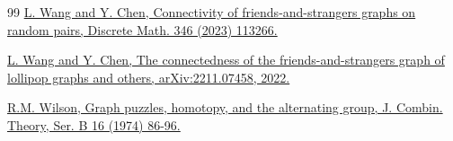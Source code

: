 \documentclass[11pt]{article}
\begin{document}
\begin{thebibliography}{99}
  \href{https://www.sciencedirect.com/science/article/pii/S0012365X22004721}{L. Wang and Y. Chen, Connectivity of friends-and-strangers graphs on random pairs, Discrete Math. 346 (2023) 113266.}

  \href{https://arxiv.org/abs/2211.07458}{L. Wang and Y. Chen, The connectedness of the friends-and-strangers graph of lollipop graphs and others, arXiv:2211.07458, 2022.}

 
   \href{http://refhub.elsevier.com/S0095-8956(22)00025-9/bibABD7372BBA55577590736EF6CB3533C6s1}{ R.M. Wilson, Graph puzzles, homotopy, and the alternating group, J. Combin. Theory, Ser. B 16
(1974) 86-96.}
 

\end{thebibliography}
\end{document}
